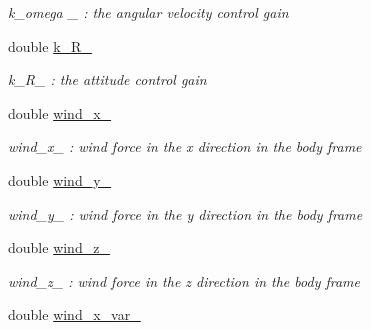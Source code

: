 \begin{DoxyCompactItemize}
\begin{DoxyCompactList}\small\item\em k\-\_\-omega \-\_\- \-: the angular velocity control gain \end{DoxyCompactList}\item 
\hypertarget{class_pose_controller_node_a8d3ed66ae4c283dd349e60d4ad19a734}{double \hyperlink{class_pose_controller_node_a8d3ed66ae4c283dd349e60d4ad19a734}{k\-\_\-\-R\-\_\-}}\label{class_pose_controller_node_a8d3ed66ae4c283dd349e60d4ad19a734}

\begin{DoxyCompactList}\small\item\em k\-\_\-\-R\-\_\- \-: the attitude control gain \end{DoxyCompactList}\item 
\hypertarget{class_pose_controller_node_ac8f3f4c42cdf72dfd1ec68359b0265db}{double \hyperlink{class_pose_controller_node_ac8f3f4c42cdf72dfd1ec68359b0265db}{wind\-\_\-x\-\_\-}}\label{class_pose_controller_node_ac8f3f4c42cdf72dfd1ec68359b0265db}

\begin{DoxyCompactList}\small\item\em wind\-\_\-x\-\_\- \-: wind force in the x direction in the body frame \end{DoxyCompactList}\item 
\hypertarget{class_pose_controller_node_a962020b9a05db946bb7ba0fee42e44ac}{double \hyperlink{class_pose_controller_node_a962020b9a05db946bb7ba0fee42e44ac}{wind\-\_\-y\-\_\-}}\label{class_pose_controller_node_a962020b9a05db946bb7ba0fee42e44ac}

\begin{DoxyCompactList}\small\item\em wind\-\_\-y\-\_\- \-: wind force in the y direction in the body frame \end{DoxyCompactList}\item 
\hypertarget{class_pose_controller_node_a70bac4c9de319285a6c6b2d162487dd1}{double \hyperlink{class_pose_controller_node_a70bac4c9de319285a6c6b2d162487dd1}{wind\-\_\-z\-\_\-}}\label{class_pose_controller_node_a70bac4c9de319285a6c6b2d162487dd1}

\begin{DoxyCompactList}\small\item\em wind\-\_\-z\-\_\- \-: wind force in the z direction in the body frame \end{DoxyCompactList}\item 
\hypertarget{class_pose_controller_node_ab9f7b3a4330c9997d2e82f7c4f6c447b}{double \hyperlink{class_pose_controller_node_ab9f7b3a4330c9997d2e82f7c4f6c447b}{wind\-\_\-x\-\_\-var\-\_\-}}\label{class_pose_controller_node_ab9f7b3a4330c9997d2e82f7c4f6c447b}


\end{DoxyCompactItemize}
